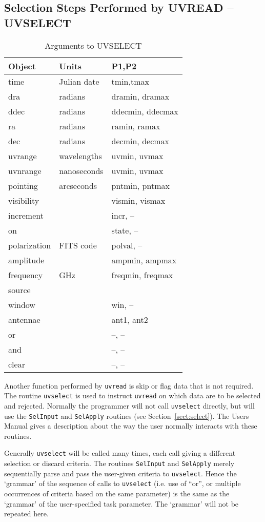 \subsection{Selection Steps Performed by UVREAD -- UVSELECT}
\begin{table}\centering
\begin{tabular}{|l|l|l|}				   \hline
\bf Object	& \bf Units	& \bf P1,P2 		\\ \hline
time		& Julian date	& tmin,tmax		\\
dra		& radians	& dramin, dramax	\\
ddec		& radians	& ddecmin, ddecmax	\\
ra		& radians	& ramin, ramax		\\
dec		& radians	& decmin, decmax	\\
uvrange		& wavelengths	& uvmin, uvmax		\\
uvnrange	& nanoseconds	& uvmin, uvmax		\\
pointing	& arcseconds	& pntmin, pntmax	\\
visibility	&		& vismin, vismax	\\
increment	&		& incr, --		\\
on		&		& state, --		\\
polarization	& FITS code	& polval, --		\\
amplitude	&		& ampmin, ampmax	\\
frequency	& GHz		& freqmin, freqmax	\\
source		&		&			\\
window		& 		& win, --		\\
antennae	&		& ant1, ant2		\\
or		&		& --, --		\\
and		&		& --, --		\\
clear		&		& --, --		\\ \hline
\end{tabular}
\caption{Arguments to UVSELECT}
\label{t:uvselect}
\end{table}
Another function performed by {\tt uvread} is skip or flag data that is not
required. The routine {\tt uvselect} is used to instruct {\tt uvread} on
which data are to be selected and rejected. Normally the programmer will
not call {\tt uvselect} directly, but will use the {\tt SelInput} and
{\tt SelApply} routines (see Section~\ref{sect:select}). The Users Manual gives a description
about the way the user normally interacts with these routines.

Generally {\tt uvselect} will be
called many times, each call giving a different selection or discard criteria.
The routines {\tt SelInput} and {\tt SelApply} merely sequentially parse and pass
the user-given
criteria to {\tt uvselect}. Hence the `grammar' of the sequence of calls to
{\tt uvselect} (i.e. use of ``or'', or multiple occurrences of
criteria based on the same parameter) is the same as the `grammar' of the
user-specified task parameter. The `grammar' will not be repeated here.

